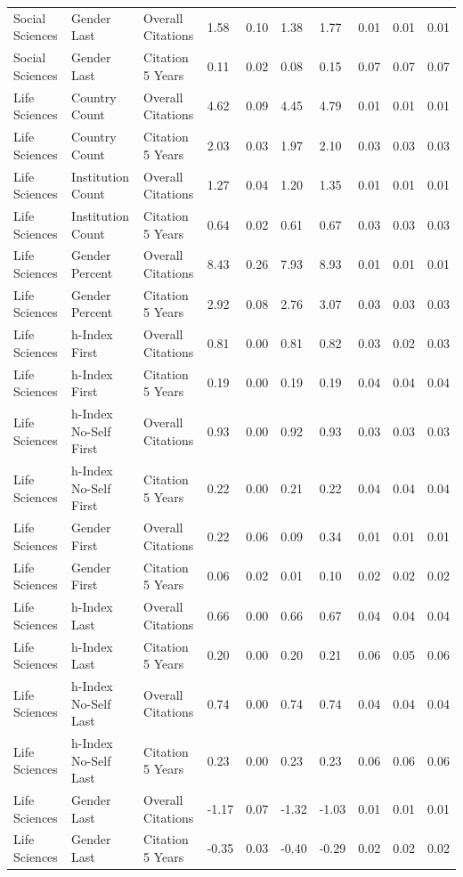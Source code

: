\documentclass[
  man,floatsintext]{apa6}
\begin{document}
\begin{table}[tbp]
\begin{center}
\begin{threeparttable}
{\begin{tabular}{llllllllll}
Social Sciences & Gender Last & Overall Citations & 1.58 & 0.10 & 1.38 & 1.77 & 0.01 & 0.01 & 0.01\\
Social Sciences & Gender Last & Citation 5 Years & 0.11 & 0.02 & 0.08 & 0.15 & 0.07 & 0.07 & 0.07\\
Life Sciences & Country Count & Overall Citations & 4.62 & 0.09 & 4.45 & 4.79 & 0.01 & 0.01 & 0.01\\
Life Sciences & Country Count & Citation 5 Years & 2.03 & 0.03 & 1.97 & 2.10 & 0.03 & 0.03 & 0.03\\
Life Sciences & Institution Count & Overall Citations & 1.27 & 0.04 & 1.20 & 1.35 & 0.01 & 0.01 & 0.01\\
Life Sciences & Institution Count & Citation 5 Years & 0.64 & 0.02 & 0.61 & 0.67 & 0.03 & 0.03 & 0.03\\
Life Sciences & Gender Percent & Overall Citations & 8.43 & 0.26 & 7.93 & 8.93 & 0.01 & 0.01 & 0.01\\
Life Sciences & Gender Percent & Citation 5 Years & 2.92 & 0.08 & 2.76 & 3.07 & 0.03 & 0.03 & 0.03\\
Life Sciences & h-Index First & Overall Citations & 0.81 & 0.00 & 0.81 & 0.82 & 0.03 & 0.02 & 0.03\\
Life Sciences & h-Index First & Citation 5 Years & 0.19 & 0.00 & 0.19 & 0.19 & 0.04 & 0.04 & 0.04\\
Life Sciences & h-Index No-Self First & Overall Citations & 0.93 & 0.00 & 0.92 & 0.93 & 0.03 & 0.03 & 0.03\\
Life Sciences & h-Index No-Self First & Citation 5 Years & 0.22 & 0.00 & 0.21 & 0.22 & 0.04 & 0.04 & 0.04\\
Life Sciences & Gender First & Overall Citations & 0.22 & 0.06 & 0.09 & 0.34 & 0.01 & 0.01 & 0.01\\
Life Sciences & Gender First & Citation 5 Years & 0.06 & 0.02 & 0.01 & 0.10 & 0.02 & 0.02 & 0.02\\
Life Sciences & h-Index Last & Overall Citations & 0.66 & 0.00 & 0.66 & 0.67 & 0.04 & 0.04 & 0.04\\
Life Sciences & h-Index Last & Citation 5 Years & 0.20 & 0.00 & 0.20 & 0.21 & 0.06 & 0.05 & 0.06\\
Life Sciences & h-Index No-Self Last & Overall Citations & 0.74 & 0.00 & 0.74 & 0.74 & 0.04 & 0.04 & 0.04\\
Life Sciences & h-Index No-Self Last & Citation 5 Years & 0.23 & 0.00 & 0.23 & 0.23 & 0.06 & 0.06 & 0.06\\
Life Sciences & Gender Last & Overall Citations & -1.17 & 0.07 & -1.32 & -1.03 & 0.01 & 0.01 & 0.01\\
Life Sciences & Gender Last & Citation 5 Years & -0.35 & 0.03 & -0.40 & -0.29 & 0.02 & 0.02 & 0.02\\
\bottomrule
\end{tabular}

}

\end{threeparttable}
\end{center}

\end{table}
\end{document}
